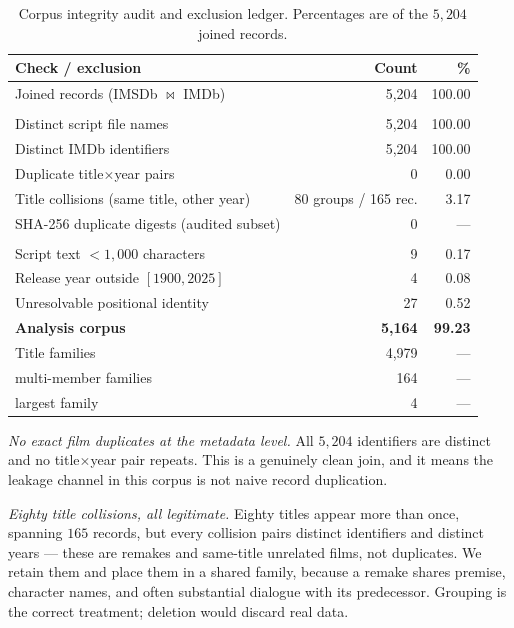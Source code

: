 \documentclass[conference,a4paper]{IEEEtran}
\begin{document}
\begin{table}[t]
\caption{Corpus integrity audit and exclusion ledger. Percentages are of
the $5{,}204$ joined records.}
\label{tab:audit}
\centering
\small
\begin{tabular}{lrr}
\toprule
\textbf{Check / exclusion} & \textbf{Count} & \textbf{\%} \\
\midrule
Joined records (IMSDb $\bowtie$ IMDb)      & 5{,}204 & 100.00 \\
\addlinespace[2pt]
\multicolumn{3}{l}{\emph{Identity keys}}\\
Distinct script file names                 & 5{,}204 & 100.00 \\
Distinct IMDb identifiers                  & 5{,}204 & 100.00 \\
Duplicate title$\times$year pairs          &       0 &   0.00 \\
Title collisions (same title, other year)  &  80 groups / 165 rec. & 3.17 \\
SHA-256 duplicate digests (audited subset) &       0 & --- \\
\addlinespace[2pt]
\multicolumn{3}{l}{\emph{Exclusions}}\\
Script text $<1{,}000$ characters          &       9 &   0.17 \\
Release year outside $[1900, 2025]$        &       4 &   0.08 \\
Unresolvable positional identity           &      27 &   0.52 \\
\midrule
\textbf{Analysis corpus}                   & \textbf{5{,}164} & \textbf{99.23} \\
\addlinespace[2pt]
Title families                             & 4{,}979 & --- \\
\quad multi-member families                &     164 & --- \\
\quad largest family                       &       4 & --- \\
\bottomrule
\end{tabular}
\end{table}

\emph{No exact film duplicates at the metadata level.} All $5{,}204$
identifiers are distinct and no title$\times$year pair repeats. This is a
genuinely clean join, and it means the leakage channel in this corpus is
not naive record duplication.

\emph{Eighty title collisions, all legitimate.} Eighty titles appear more
than once, spanning $165$ records, but every collision pairs distinct
identifiers and distinct years --- these are remakes and same-title
unrelated films, not duplicates. We retain them and place them in a
shared family, because a remake shares premise, character names, and
often substantial dialogue with its predecessor. Grouping is the correct
treatment; deletion would discard real data.
\end{document}
